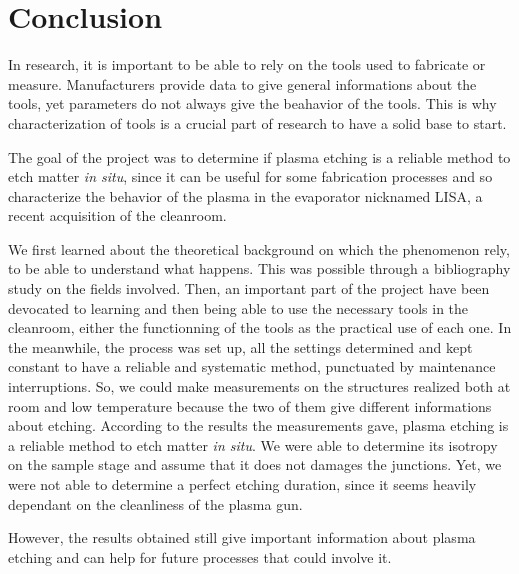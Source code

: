 \pagestyle{fancy}
\chapter*{Conclusion}

In research, it is important to be able to rely on the tools used to fabricate or measure. Manufacturers provide data to give general informations about the tools, yet parameters do not always give the beahavior of the tools. This is why characterization of tools is a crucial part of research to have a solid base to start. 

The goal of the project was to determine if plasma etching is a reliable method to etch matter \textit{in situ}, since it can be useful for some fabrication processes and so characterize the behavior of the plasma in the evaporator nicknamed LISA, a recent acquisition of the cleanroom.

We first learned about the theoretical background on which the phenomenon rely, to be able to understand what happens. This was possible through a bibliography study on the fields involved. Then, an important part of the project have been devocated to learning and then being able to use the necessary tools in the cleanroom, either the functionning of the tools as the practical use of each one. In the meanwhile, the process was set up, all the settings determined and kept constant to have a reliable and systematic method, punctuated by maintenance interruptions. So, we could make measurements on the structures realized both at room and low temperature because the two of them give different informations about etching. According to the results the measurements gave, plasma etching is a reliable method to etch matter \textit{in situ}. We were able to determine its isotropy on the sample stage and assume that it does not damages the junctions. Yet, we were not able to determine a perfect etching duration, since it seems heavily dependant on the cleanliness of the plasma gun. 

However, the results obtained still give important information about plasma etching and can help for future processes that could involve it.

